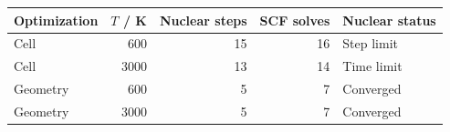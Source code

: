 \begin{tabular}{lrrrl}\toprule
Optimization & $T$ / K & Nuclear steps & SCF solves & Nuclear status\\\midrule
Cell & 600 & 15 & 16 & Step limit\\
Cell & 3000 & 13 & 14 & Time limit\\
Geometry & 600 & 5 & 7 & Converged\\
Geometry & 3000 & 5 & 7 & Converged\\
\bottomrule\end{tabular}
